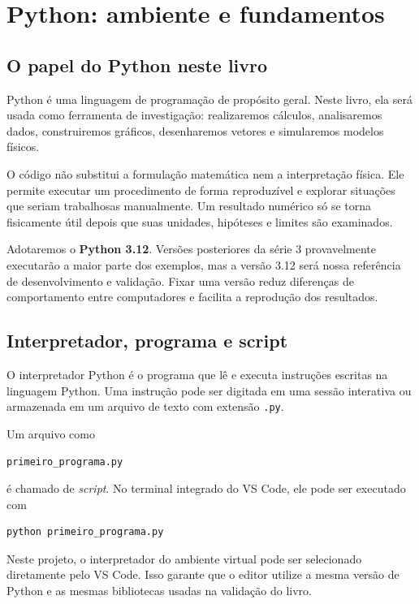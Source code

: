 \chapter{Python: ambiente e fundamentos}
\label{cap:python-fundamentos}

\section{O papel do Python neste livro}

Python é uma linguagem de programação de propósito geral. Neste livro, ela será usada como ferramenta de investigação: realizaremos cálculos, analisaremos dados, construiremos gráficos, desenharemos vetores e simularemos modelos físicos.

O código não substitui a formulação matemática nem a interpretação física. Ele permite executar um procedimento de forma reproduzível e explorar situações que seriam trabalhosas manualmente. Um resultado numérico só se torna fisicamente útil depois que suas unidades, hipóteses e limites são examinados.

Adotaremos o \textbf{Python 3.12}. Versões posteriores da série 3 provavelmente executarão a maior parte dos exemplos, mas a versão 3.12 será nossa referência de desenvolvimento e validação. Fixar uma versão reduz diferenças de comportamento entre computadores e facilita a reprodução dos resultados.

\section{Interpretador, programa e script}

O interpretador Python é o programa que lê e executa instruções escritas na linguagem Python. Uma instrução pode ser digitada em uma sessão interativa ou armazenada em um arquivo de texto com extensão \texttt{.py}.

Um arquivo como

\begin{center}
  \texttt{primeiro\_programa.py}
\end{center}

é chamado de \emph{script}. No terminal integrado do VS Code, ele pode ser executado com

\begin{lstlisting}[language={},numbers=none]
python primeiro_programa.py
\end{lstlisting}

Neste projeto, o interpretador do ambiente virtual pode ser selecionado diretamente pelo VS Code. Isso garante que o editor utilize a mesma versão de Python e as mesmas bibliotecas usadas na validação do livro.

